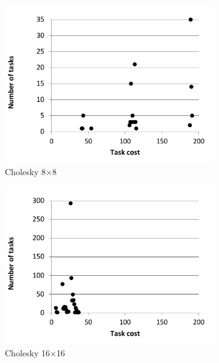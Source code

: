 \begin{figure}[!t]
\centering
\begin{subfigure}[b]{0.3\textwidth}
  \includegraphics[width=\textwidth]{Figs/cholesky_8x8_distribution.pdf}
  \caption{Cholesky 8$\times$8}
  \label{cholesky8x8_dist}
\end{subfigure}
\begin{subfigure}[b]{0.3\textwidth}
  \includegraphics[width=\textwidth]{Figs/cholesky_16x16_distribution.pdf}
  \caption{Cholesky 16$\times$16}
  \label{cholesky16x16_dist}
\end{subfigure}
\begin{subfigure}[b]{0.3\textwidth}

\end{subfigure}
\end{figure}
